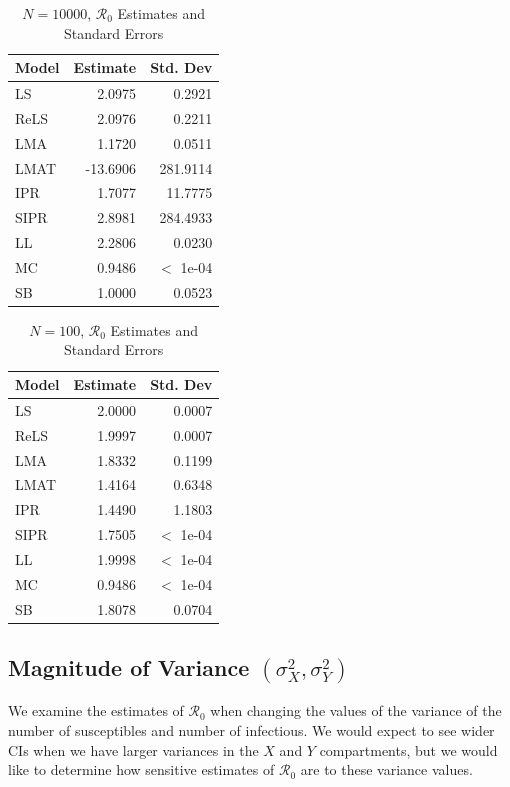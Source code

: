\documentclass[12pt]{article}
\newcommand{\rr}{\ensuremath{\mathcal{R}_0}}
\begin{document}
\begin{table}[H]
	
	\centering
	\begin{tabular}[t]{l|r|r}
		\hline
		Model & Estimate & Std. Dev\\
		\hline
		LS & 2.0975 & 0.2921\\
		\hline
		ReLS & 2.0976 & 0.2211\\
		\hline
		LMA & 1.1720 & 0.0511\\
		\hline
		LMAT & -13.6906 & 281.9114\\
		\hline
		IPR & 1.7077 & 11.7775\\
		\hline
		SIPR & 2.8981 & 284.4933\\
		\hline
		LL & 2.2806 & 0.0230\\
		\hline
		MC & 0.9486 & $<$ 1e-04\\
		\hline
		SB & 1.0000 & 0.0523\\
		\hline
	\end{tabular}
	\caption{$N = 10000$, $\rr$ Estimates and Standard Errors}
\end{table}

\begin{table}[H]
	
	\centering
	\begin{tabular}[t]{l|r|r}
		\hline
		Model & Estimate & Std. Dev\\
		\hline
		LS & 2.0000 & 0.0007\\
		\hline
		ReLS & 1.9997 & 0.0007\\
		\hline
		LMA & 1.8332 & 0.1199\\
		\hline
		LMAT & 1.4164 & 0.6348\\
		\hline
		IPR & 1.4490 & 1.1803\\
		\hline
		SIPR & 1.7505 & $<$ 1e-04\\
		\hline
		LL & 1.9998 & $<$ 1e-04\\
		\hline
		MC & 0.9486 & $<$ 1e-04\\
		\hline
		SB & 1.8078 & 0.0704\\
		\hline
	\end{tabular}
	\caption{$N = 100$, $\rr$ Estimates and Standard Errors}
\end{table}

\subsection{Magnitude of Variance $(\sigma^2_X, \sigma^2_Y)$}\label{sec:res-var}
We examine the estimates of $\rr$ when changing the values of the variance of the number of susceptibles and number of infectious.  We would expect to see wider CIs when we have larger variances in the $X$ and $Y$ compartments, but we would like to determine how sensitive estimates of $\rr$ are to these variance values.
\end{document}
